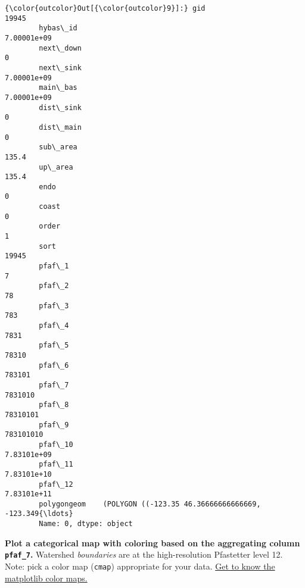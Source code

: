 \documentclass[11pt]{article}
\begin{document}
\begin{Verbatim}[commandchars=\\\{\}]
{\color{outcolor}Out[{\color{outcolor}9}]:} gid                                                        19945
        hybas\_id                                             7.00001e+09
        next\_down                                                      0
        next\_sink                                            7.00001e+09
        main\_bas                                             7.00001e+09
        dist\_sink                                                      0
        dist\_main                                                      0
        sub\_area                                                   135.4
        up\_area                                                    135.4
        endo                                                           0
        coast                                                          0
        order                                                          1
        sort                                                       19945
        pfaf\_1                                                         7
        pfaf\_2                                                        78
        pfaf\_3                                                       783
        pfaf\_4                                                      7831
        pfaf\_5                                                     78310
        pfaf\_6                                                    783101
        pfaf\_7                                                   7831010
        pfaf\_8                                                  78310101
        pfaf\_9                                                 783101010
        pfaf\_10                                              7.83101e+09
        pfaf\_11                                              7.83101e+10
        pfaf\_12                                              7.83101e+11
        polygongeom    (POLYGON ((-123.35 46.36666666666669, -123.349{\ldots}
        Name: 0, dtype: object
\end{Verbatim}
            
    \textbf{Plot a categorical map with coloring based on the aggregating
column \texttt{pfaf\_7}.} Watershed \emph{boundaries} are at the
high-resolution Pfastetter level 12.\\
Note: pick a color map (\texttt{cmap}) appropriate for your data.
\href{https://matplotlib.org/tutorials/colors/colormaps.html}{Get to
know the matplotlib color maps.}
\end{document}
